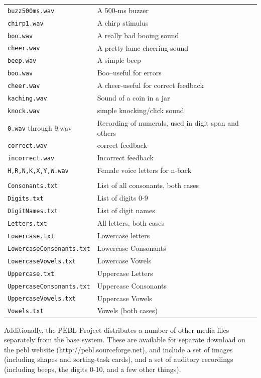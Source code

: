 \begin{longtable}{ll}
\texttt{buzz500ms.wav}   &A 500-ms buzzer\\
\texttt{chirp1.wav}      &A chirp stimulus\\
\texttt{boo.wav}         &A really bad booing sound\\
\texttt{cheer.wav}       &A pretty lame cheering sound\\
\texttt{beep.wav}        &A simple beep\\
\texttt{boo.wav}         &Boo--useful for errors\\
\texttt{cheer.wav}&A cheer-useful for correct feedback\\
\texttt{kaching.wav} &Sound of a coin in a jar\\
\texttt{knock.wav} & simple knocking/click sound\\
\texttt{0.wav} through {9.wav} & Recording of numerals, used in digit span and others\\
\texttt{correct.wav}&correct feedback\\
\texttt{incorrect.wav}&Incorrect feedback\\
\texttt{H,R,N,K,X,Y,W.wav}&Female voice letters for n-back\\
\addlinespace[.1cm]
\midrule
\addlinespace[.2cm]
\multicolumn{2}{l}{\textbf{In `media/text/'}:}\\
\addlinespace[.2cm]
\texttt{Consonants.txt}  &List of all consonants, both cases\\
\texttt{Digits.txt}               &List of digits 0-9\\
\texttt{DigitNames.txt}           &List of digit names\\
\texttt{Letters.txt}              &All letters, both cases\\
\texttt{Lowercase.txt}            &Lowercase letters\\
\texttt{LowercaseConsonants.txt}  &Lowercase Consonants\\
\texttt{LowercaseVowels.txt}      &Lowercase Vowels\\
\texttt{Uppercase.txt}            &Uppercase Letters\\
\texttt{UppercaseConsonants.txt}  &Uppercase Consonants\\
\texttt{UppercaseVowels.txt}      &Uppercase Vowels\\
\texttt{Vowels.txt}               &Vowels (both cases)\\

\end{longtable}

Additionally, the PEBL Project distributes a number of other media
files separately from the base system.  These are available for separate
download on the pebl website (http://pebl.sourceforge.net), and
include a set of images (including shapes and sorting-task cards), and
a set of auditory recordings (including beeps, the digits 0-10, and a
few other things).

